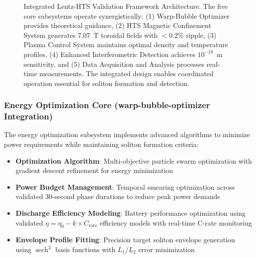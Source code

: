 \documentclass[12pt,a4paper]{article}
\newcommand{\sech}{\operatorname{sech}}
\begin{document}
\begin{figure}[htbp]
\centering
{}
\caption{Integrated Lentz-HTS Validation Framework Architecture. The five core subsystems operate synergistically: (1) Warp-Bubble Optimizer provides theoretical guidance, (2) HTS Magnetic Confinement System generates 7.07~T toroidal fields with $<0.2\%$ ripple, (3) Plasma Control System maintains optimal density and temperature profiles, (4) Enhanced Interferometric Detection achieves $10^{-18}$~m sensitivity, and (5) Data Acquisition and Analysis processes real-time measurements. The integrated design enables coordinated operation essential for soliton formation and detection.}
\label{fig:framework}
\end{figure}

\subsubsection{Energy Optimization Core (warp-bubble-optimizer Integration)}

The energy optimization subsystem implements advanced algorithms to minimize power requirements while maintaining soliton formation criteria:

\begin{itemize}
\item \textbf{Optimization Algorithm}: Multi-objective particle swarm optimization with gradient descent refinement for energy minimization
\item \textbf{Power Budget Management}: Temporal smearing optimization across validated 30-second phase durations to reduce peak power demands
\item \textbf{Discharge Efficiency Modeling}: Battery performance optimization using validated $\eta = \eta_0 - k \times C_{\text{rate}}$ efficiency models with real-time C-rate monitoring
\item \textbf{Envelope Profile Fitting}: Precision target soliton envelope generation using $\sech^2$ basis functions with $L_1/L_2$ error minimization
\end{itemize}
\end{document}
